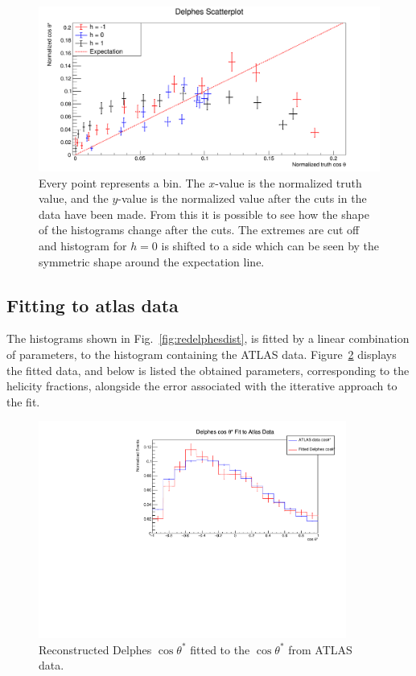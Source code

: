 \documentclass[12pt,a4paper]{article}
\numberwithin{equation}{section}
\begin{document}
\begin{figure}[H]
  \centering
  \includegraphics[width=\linewidth]{figures/scatterplot}
  \caption{\label{fig:scatterplot}Every point represents a bin. The $x$-value is
    the normalized truth value, and the $y$-value is the normalized value after
    the cuts in the data have been made. From this it is possible to see how the
    shape of the histograms change after the cuts. The extremes are cut off and
    histogram for $h=0$ is shifted to a side which can be seen by the symmetric
    shape around the expectation line.}
\end{figure}

\subsection{Fitting to atlas data}
The histograms shown in Fig.~\ref{fig:redelphesdist}, is fitted by a linear
combination of parameters, to the histogram containing the ATLAS data.
Figure~\ref{fig:delphesfit} displays the fitted data, and below is listed the
obtained parameters, corresponding to the helicity fractions, alongside the
error associated with the itterative approach to the fit.

\begin{figure}[H]
  \centering
  \includegraphics[width=0.9\textwidth]{figures/delphes_fit}
  \caption{\label{fig:delphesfit}Reconstructed Delphes $\cos \theta^{*}$ fitted to
    the $\cos \theta^{*}$ from ATLAS data.}
\end{figure}
\end{document}
